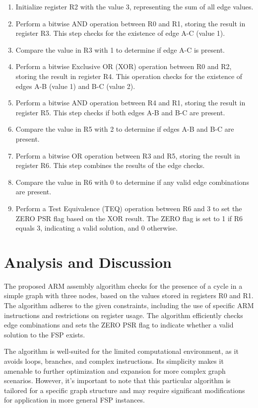 \begin{enumerate}
    \item Initialize register R2 with the value 3, representing the sum of all edge values.
    \item Perform a bitwise AND operation between R0 and R1, storing the result in register R3. This step checks for the existence of edge A-C (value 1).
    \item Compare the value in R3 with 1 to determine if edge A-C is present.
    \item Perform a bitwise Exclusive OR (XOR) operation between R0 and R2, storing the result in register R4. This operation checks for the existence of edges A-B (value 1) and B-C (value 2).
    \item Perform a bitwise AND operation between R4 and R1, storing the result in register R5. This step checks if both edges A-B and B-C are present.
    \item Compare the value in R5 with 2 to determine if edges A-B and B-C are present.
    \item Perform a bitwise OR operation between R3 and R5, storing the result in register R6. This step combines the results of the edge checks.
    \item Compare the value in R6 with 0 to determine if any valid edge combinations are present.
    \item Perform a Test Equivalence (TEQ) operation between R6 and 3 to set the ZERO PSR flag based on the XOR result. The ZERO flag is set to 1 if R6 equals 3, indicating a valid solution, and 0 otherwise.
\end{enumerate}

\section{Analysis and Discussion}

The proposed ARM assembly algorithm checks for the presence of a cycle in a simple graph with three nodes, based on the values stored in registers R0 and R1. The algorithm adheres to the given constraints, including the use of specific ARM instructions and restrictions on register usage. The algorithm efficiently checks edge combinations and sets the ZERO PSR flag to indicate whether a valid solution to the FSP exists.

The algorithm is well-suited for the limited computational environment, as it avoids loops, branches, and complex instructions. Its simplicity makes it amenable to further optimization and expansion for more complex graph scenarios. However, it's important to note that this particular algorithm is tailored for a specific graph structure and may require significant modifications for application in more general FSP instances.

